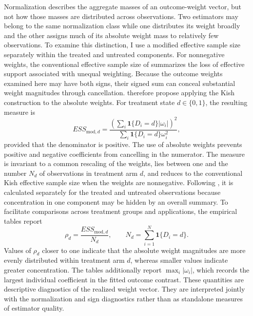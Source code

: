 \documentclass[12pt, a4paper, oneside]{article}
\theoremstyle{plain}
\theoremstyle{definition}
\begin{document}
Normalization describes the aggregate masses of an outcome-weight vector, but
not how those masses are distributed across observations. Two estimators may
belong to the same normalization class while one distributes its weight
broadly and the other assigns much of its absolute weight mass to relatively
few observations. To examine this distinction, I use a modified effective
sample size separately within the treated and untreated components.
For nonnegative weights, the conventional effective sample size of
\citet{kish1965survey} summarizes the loss of effective support associated
with unequal weighting. Because the outcome weights examined here may have
both signs, their signed sum can conceal substantial weight magnitudes through
cancellation. \citet[Section~5.4]{chattopadhyay2023implied} therefore propose
applying the Kish construction to the absolute weights. For treatment state
\(d\in\{0,1\}\), the resulting measure is
\begin{equation}
    ESS_{\mathrm{mod},d}
    =
    \frac{
      \left(
        \sum_i\mathbf 1\{D_i=d\}|\omega_i|
      \right)^2
    }{
      \sum_i\mathbf 1\{D_i=d\}\omega_i^2
    },
    \label{eq:ess_modified_group}
\end{equation}
provided that the denominator is positive.
The use of absolute weights prevents positive and negative coefficients from
cancelling in the numerator. The measure is invariant to a common rescaling
of the weights, lies between one and the number \(N_d\) of observations in
treatment arm \(d\), and reduces to the conventional Kish effective sample
size when the weights are nonnegative. Following
\citet{chattopadhyay2023implied}, it is calculated separately for the treated
and untreated observations because concentration in one component may be
hidden by an overall summary.
To facilitate comparisons across treatment groups and applications, the
empirical tables report
\begin{equation}
    \rho_d
    =
    \frac{ESS_{\mathrm{mod},d}}{N_d},
    \qquad
    N_d=\sum_{i=1}^{N}\mathbf 1\{D_i=d\}.
    \label{eq:ess_retention}
\end{equation}
Values of \(\rho_d\) closer to one indicate that the absolute weight
magnitudes are more evenly distributed within treatment arm \(d\), whereas
smaller values indicate greater concentration. The tables additionally report
\(\max_i|\omega_i|\), which records the largest individual coefficient in the
fitted outcome contrast.
These quantities are descriptive diagnostics of the realized weight vector.
They are interpreted jointly with the normalization and sign
diagnostics rather than as standalone measures of estimator quality.
\end{document}
